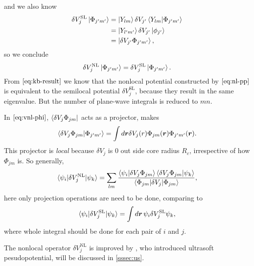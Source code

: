 and we also know
\begin{equation}
	\begin{split}
		\delta V_{j}^\text{SL} \ket{ \Phi_{j'm'} }
		&= \ket{Y_{lm}} \delta V_{j'} \braket{Y_{lm} | \Phi_{j'm'} } \\
		&= \ket{Y_{l'm'}} \delta V_{j'} \ket{\phi_{j'}} \\
		&= \ket{ \delta V_{j'} \Phi_{j'm'} },
	\end{split}
\end{equation}
so we conclude
\begin{equation}\label{eq:kb-result}
	\delta V_j^\text{NL} \ket{\Phi_{j'm'}} = \delta V_{j}^\text{SL} \ket{ \Phi_{j'm'} }.
\end{equation}
From $\eqref{eq:kb-result}$ we know that the nonlocal potential constructed by
$\eqref{eq:nl-pp}$ is equivalent to the semilocal potential $\delta V_{j}^\text{SL}$,
because they result in the same eigenvalue. But the number of
plane-wave integrals is reduced to $mn$.

In $\eqref{eq:vnl-phi}$, $\bra{\delta V_j \Phi_{jm}}$ acts as a projector,\cite{martin2004electronic} makes
\begin{equation}
	\braket{\delta V_j \Phi_{jm} | \Phi_{j'm'} } = \int d\bm{r} \delta V_j (r)
	\Phi_{jm} (\bm{r}) \Phi_{j'm'} (\bm{r}).
\end{equation}
This projector
is \emph{local} because $\delta V_j$ is $0$ out side core radius $R_c$,
irrespective of how $\Phi_{jm}$ is.
So generally,\cite{martin2004electronic}
\begin{equation}
	\braket{ \psi_i | \delta V_j^\text{NL} | \psi_k }
	= \sum_{lm}
	\frac{ \braket{\psi_i | \delta V_j \Phi_{jm}}
		\braket{\delta V_j \Phi_{jm}  | \psi_k } }{
		\braket{ \Phi_{jm} | \delta V_j | \Phi_{jm} } },
\end{equation}
here only projection operations are need to be done,
comparing to
\begin{equation}
	\braket{ \psi_i | \delta V_j^\text{SL} | \psi_k }
	= \int d\bm{r} \, \psi_i \delta V_j^\text{SL} \psi_k,
\end{equation}
where whole integral should be done for each pair of $i$ and $j$.

The nonlocal operator $\delta V_j^\text{NL}$ is improved
by \citeauthor{Vanderbilt:1990is}, who introduced ultrasoft pesudopotential, will be discussed in \ref{sssec:us}.